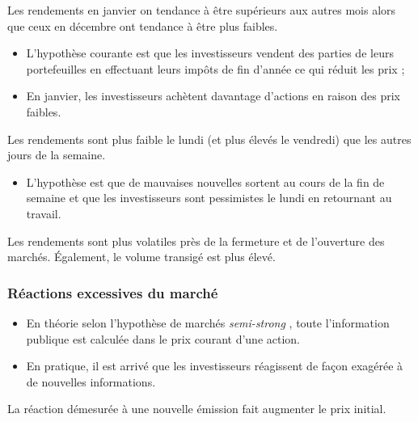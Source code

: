 \documentclass[10pt, french]{article}
\begin{document}
\begin{multicols*}{2}
\begin{definitionNOHFILLprop}
Les rendements en janvier on tendance à être supérieurs aux autres mois alors que ceux en décembre ont tendance à être plus faibles.
\begin{itemize}
	\item	L'hypothèse courante est que les investisseurs vendent des parties de leurs portefeuilles en effectuant leurs impôts de fin d'année ce qui réduit les prix ;
	\item	En janvier, les investisseurs achètent davantage d'actions en raison des prix faibles.
\end{itemize}
\end{definitionNOHFILLprop}

\begin{definitionNOHFILLprop}
Les rendements sont plus faible le lundi (et plus élevés le vendredi) que les autres jours de la semaine.

\begin{itemize}
	\item	L'hypothèse est que de mauvaises nouvelles sortent au cours de la fin de semaine et que les investisseurs sont pessimistes le lundi en retournant au travail.
\end{itemize}
\end{definitionNOHFILLprop}

\begin{definitionNOHFILLprop}
Les rendements sont plus volatiles près de la fermeture et de l'ouverture des marchés. Également, le volume transigé est plus élevé.
\end{definitionNOHFILLprop}

\subsubsection{Réactions excessives du marché}
\begin{itemize}
	\item	En théorie selon l'hypothèse de marchés \og \textit{semi-strong} \fg{}, toute l'information publique est calculée dans le prix courant d'une action. 
	\item	En pratique, il est arrivé que les investisseurs réagissent de façon exagérée à de nouvelles informations.
\end{itemize}

\begin{definitionNOHFILLprop}
La réaction démesurée à une nouvelle émission fait augmenter le prix initial. 


\end{definitionNOHFILLprop}
\end{multicols*}
\end{document}
